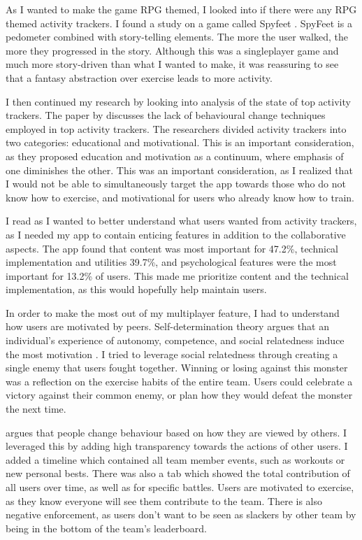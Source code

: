\documentclass{l4proj}
\begin{document}
As I wanted to make the game RPG themed, I looked into if there were any RPG themed activity trackers. I found a study on a game called Spyfeet \citep{SpyFeet}. SpyFeet is a pedometer combined with story-telling elements. The more the user walked, the more they progressed in the story. Although this was a singleplayer game and much more story-driven than what I wanted to make, it was reassuring to see that a fantasy abstraction over exercise leads to more activity.

I then continued my research by looking into analysis of the state of top activity trackers. The paper by \citet{Behavior_change} discusses the lack of behavioural change techniques employed in top activity trackers. The researchers divided activity trackers into two categories: educational and motivational. This is an important consideration, as they proposed education and motivation as a continuum, where emphasis of one diminishes the other. This was an important consideration, as I realized that I would not be able to simultaneously target the app towards those who do not know how to exercise, and motivational for users who already know how to train.

I read \citet{User_expectations} as I wanted to better understand what users wanted from activity trackers, as I needed my app to contain enticing features in addition to the collaborative aspects. The app found that content was most important for 47.2\%, technical implementation and utilities 39.7\%, and psychological features were the most important for 13.2\% of users. This made me prioritize content and the technical implementation, as this would hopefully help maintain users.

In order to make the most out of my multiplayer feature, I had to understand how users are motivated by peers. Self-determination theory argues that an individual's experience of autonomy, competence, and social relatedness induce the most motivation \citep{self_determination_theory}. I tried to leverage social relatedness through creating a single enemy that users fought together. Winning or losing against this monster was a reflection on the exercise habits of the entire team. Users could celebrate a victory against their common enemy, or plan how they would defeat the monster the next time.

\citet{social_comparison_theory} argues that people change behaviour based on how they are viewed by others. I leveraged this by adding high transparency towards the actions of other users. I added a timeline which contained all team member events, such as workouts or new personal bests. There was also a tab which showed the total contribution of all users over time, as well as for specific battles. Users are motivated to exercise, as they know everyone will see them contribute to the team. There is also negative enforcement, as users don't want to be seen as slackers by other team by being in the bottom of the team's leaderboard.
\end{document}
